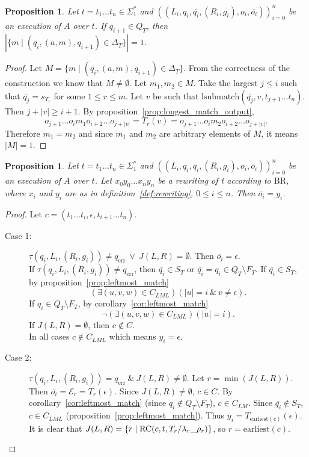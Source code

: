 \documentclass{article}
\newtheorem{proposition}[definition]{Proposition}
\newcommand{\len}[1]{\ensuremath{\left| #1 \right|}}
\begin{document}
	\begin{proposition} \label{prop:execution_outputs_are_unique}
		Let $t=t_1\ldots t_n\in \Sigma_1^*$ and $((L_i, q_i, \overline{q_i}, (R_i, g_i), o_i, \overline{o_i}))_{i=0}^n$ be an execution of $A$ over $t$. If $q_{i+1}\in Q_T$, then $\len{\{ m \mid (\overline{q_i}, (a, m), q_{i+1})\in \Delta_T \}} = 1$.
	\end{proposition}
	\begin{proof}
		Let $M = \{ m \mid (\overline{q_i}, (a, m), q_{i+1})\in \Delta_T \}$.
		From the correctness of the construction we know that $M\ne\emptyset$.
		Let $m_1, m_2\in M$. Take the largest $j\le i$ such that $\overline{q_j} = s_{T_r}$ for some $1\le r\le m$.
		Let $v$ be such that $\mathrm{lsubmatch}(\overline{q_j}, v, t_{j+1}\ldots t_n)$. Then $j+\len{v}\ge i+1$.
		By proposition~\ref{prop:longest_match_output},
		\[ o_{j+1}\ldots o_im_1o_{i+2}\ldots o_{j+\len{v}} = T_r(v) = o_{j+1}\ldots o_im_2o_{i+2}\ldots o_{j+\len{v}}. \]
		Therefore $m_1 = m_2$ and since $m_1$ and $m_2$ are arbitrary elements of $M$, it means $\len{M} = 1$.
	\end{proof}

	\begin{proposition} \label{prop:output_for_epsilon}
		Let $t=t_1\ldots t_n\in \Sigma_1^*$ and $((L_i, q_i, \overline{q_i}, (R_i, g_i), o_i, \overline{o_i}))_{i=0}^n$ be an execution of $A$ over $t$. Let $x_0y_0\ldots x_ny_n$ be a rewriting of t according to $\mathrm{BR}$, where $x_i$ and $y_i$ are as in definition~\ref{def:rewriting}, $0\le i\le n$.
		Then $\overline{o_i} = y_i$.
	\end{proposition}
	\begin{proof}
		Let	$c = (t_1\ldots t_i, \epsilon, t_{i+1}\ldots t_n)$.
		\begin{description}
			\item[Case 1:] $\tau(q_i, L_i, (R_i, g_i))\ne q_\mathrm{err}\ \lor\ J(L, R) = \emptyset$.
				Then $\overline{o_i} = \epsilon$. \\
				If $\tau(q_i, L_i, (R_i, g_i))\ne q_\mathrm{err}$,
				then $\overline{q_i}\in S_T$ or $\overline{q_i} = q_i\in Q_T\setminus F_T$.
				If $\overline{q_i}\in S_T$, by proposition~\ref{prop:leftmost_match}
				\[ (\exists (u, v, w)\in C_{LML})(\len{u}=i\ \&\ v\ne\epsilon). \]
				If $q_i\in Q_T\setminus F_T$, by corollary~\ref{cor:leftmost_match}
				\[ \lnot(\exists (u, v, w)\in C_{LML})(\len{u}=i). \]
				If $J(L, R) = \emptyset$, then $c\notin C$. \\
				In all cases $c\notin C_{LML}$ which means $y_i = \epsilon$.
			\item[Case 2:] $\tau(q_i, L_i, (R_i, g_i)) = q_\mathrm{err}\ \&\ J(L, R)\ne \emptyset$. Let $r=\min(J(L, R))$.
				Then $\overline{o_i} = \mathcal{E}_r = T_r(\epsilon)$. Since $J(L, R)\ne \emptyset$, $c\in C$.
				By corollary~\ref{cor:leftmost_match} (since $q_i\notin Q_T\setminus F_T$), $c\in C_{LM}$. Since $\overline{q_i}\notin S_T$, $c\in C_{LML}$ (proposition~\ref{prop:leftmost_match}). Thus $y_i = T_{\mathrm{earliest}(c)}(\epsilon)$. It is clear that $J(L, R) = \{ r \mid \mathrm{RC}(c, t, \crr[T_r][\lambda_r][\rho_r]) \}$, so $r = \mathrm{earliest}(c)$.
		\end{description}
	\end{proof}
\end{document}
